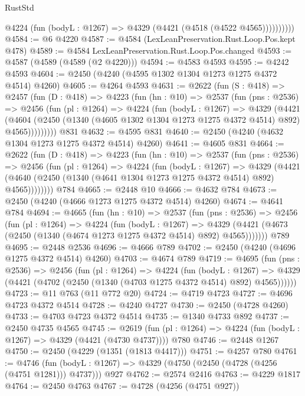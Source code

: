 \begin{lexlean}{RustStd}
\begin{coremodule}
              @4224 (fun (bodyL : @1267) => @4329 (@4421 (@4518 (@4522 @4565))))))))))
@4584 := @6 @4220
@4587 := @4584 (LexLeanPreservation.Rust.Loop.Pos.kept @478)
@4589 := @4584 LexLeanPreservation.Rust.Loop.Pos.changed
@4593 := @4587 (@4589 (@4589 (@2 @4220)))
@4594 := @4583 @4593
@4595 := @4242 @4593
@4604 := @2450 (@4240 (@4595 @1302 @1304 @1273 @1275 @4372 @4514) @4260)
@4605 := @4264 @4593
@4631 := @2622
    (fun (S : @418) =>
    @2457
      (fun (D : @418) =>
      @4223
        (fun (hn : @10) =>
        @2537
          (fun (pns : @2536) =>
          @2456
            (fun (pl : @1264) =>
            @4224
              (fun (bodyL : @1267) =>
              @4329
                (@4421
                  (@4604
                    (@2450 (@1340 (@4605 @1302 @1304 @1273 @1275 @4372 @4514) @892) @4565)))))))))
    @831
@4632 := @4595 @831
@4640 := @2450 (@4240 (@4632 @1304 @1273 @1275 @4372 @4514) @4260)
@4641 := @4605 @831
@4664 := @2622
    (fun (D : @418) =>
    @4223
      (fun (hn : @10) =>
      @2537
        (fun (pns : @2536) =>
        @2456
          (fun (pl : @1264) =>
          @4224
            (fun (bodyL : @1267) =>
            @4329
              (@4421 (@4640 (@2450 (@1340 (@4641 @1304 @1273 @1275 @4372 @4514) @892) @4565))))))))
    @784
@4665 := @2448 @10
@4666 := @4632 @784
@4673 := @2450 (@4240 (@4666 @1273 @1275 @4372 @4514) @4260)
@4674 := @4641 @784
@4694 := @4665
    (fun (hn : @10) =>
    @2537
      (fun (pns : @2536) =>
      @2456
        (fun (pl : @1264) =>
        @4224
          (fun (bodyL : @1267) =>
          @4329 (@4421 (@4673 (@2450 (@1340 (@4674 @1273 @1275 @4372 @4514) @892) @4565)))))))
    @789
@4695 := @2448 @2536
@4696 := @4666 @789
@4702 := @2450 (@4240 (@4696 @1275 @4372 @4514) @4260)
@4703 := @4674 @789
@4719 := @4695
    (fun (pns : @2536) =>
    @2456
      (fun (pl : @1264) =>
      @4224
        (fun (bodyL : @1267) =>
        @4329 (@4421 (@4702 (@2450 (@1340 (@4703 @1275 @4372 @4514) @892) @4565))))))
@4723 := @11 @763 (@11 @772 @20)
@4724 := @4719 @4723
@4727 := @4696 @4723 @4372 @4514
@4728 := @4240 @4727
@4730 := @2450 (@4728 @4260)
@4733 := @4703 @4723 @4372 @4514
@4735 := @1340 @4733 @892
@4737 := @2450 @4735 @4565
@4745 := @2619 (fun (pl : @1264) => @4224 (fun (bodyL : @1267) => @4329 (@4421 (@4730 @4737)))) @780
@4746 := @2448 @1267
@4750 := @2450 (@4229 (@1351 (@1813 @4417)))
@4751 := @4257 @780
@4761 := @4746
    (fun (bodyL : @1267) => @4329 (@4750 (@2450 (@4728 (@4256 (@4751 @1281))) @4737)))
    @927
@4762 := @2574 @2416
@4763 := @4229 @1817
@4764 := @2450 @4763
@4767 := @4728 (@4256 (@4751 @927))

\end{coremodule}
\end{lexlean}
